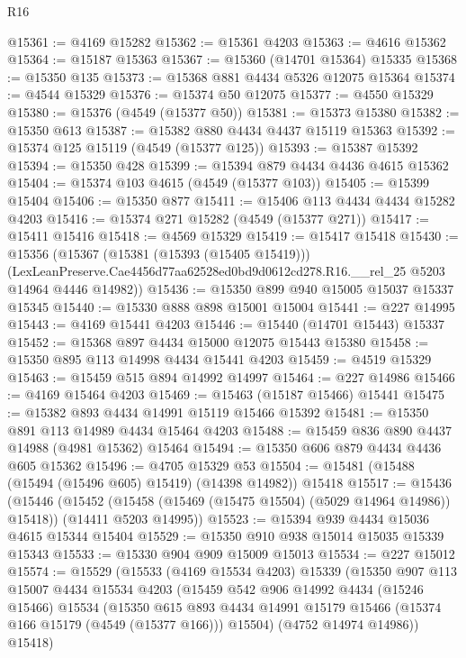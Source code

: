 \begin{lexlean}{R16}
\begin{coremodule}
@15361 := @4169 @15282
@15362 := @15361 @4203
@15363 := @4616 @15362
@15364 := @15187 @15363
@15367 := @15360 (@14701 @15364) @15335
@15368 := @15350 @135
@15373 := @15368 @881 @4434 @5326 @12075 @15364
@15374 := @4544 @15329
@15376 := @15374 @50 @12075
@15377 := @4550 @15329
@15380 := @15376 (@4549 (@15377 @50))
@15381 := @15373 @15380
@15382 := @15350 @613
@15387 := @15382 @880 @4434 @4437 @15119 @15363
@15392 := @15374 @125 @15119 (@4549 (@15377 @125))
@15393 := @15387 @15392
@15394 := @15350 @428
@15399 := @15394 @879 @4434 @4436 @4615 @15362
@15404 := @15374 @103 @4615 (@4549 (@15377 @103))
@15405 := @15399 @15404
@15406 := @15350 @877
@15411 := @15406 @113 @4434 @4434 @15282 @4203
@15416 := @15374 @271 @15282 (@4549 (@15377 @271))
@15417 := @15411 @15416
@15418 := @4569 @15329
@15419 := @15417 @15418
@15430 := @15356
    (@15367
      (@15381 (@15393 (@15405 @15419)))
      (LexLeanPreserve.Cae4456d77aa62528ed0bd9d0612cd278.R16.__rel_25 @5203 @14964 @4446 @14982))
@15436 := @15350 @899 @940 @15005 @15037 @15337 @15345
@15440 := @15330 @888 @898 @15001 @15004
@15441 := @227 @14995
@15443 := @4169 @15441 @4203
@15446 := @15440 (@14701 @15443) @15337
@15452 := @15368 @897 @4434 @15000 @12075 @15443 @15380
@15458 := @15350 @895 @113 @14998 @4434 @15441 @4203
@15459 := @4519 @15329
@15463 := @15459 @515 @894 @14992 @14997
@15464 := @227 @14986
@15466 := @4169 @15464 @4203
@15469 := @15463 (@15187 @15466) @15441
@15475 := @15382 @893 @4434 @14991 @15119 @15466 @15392
@15481 := @15350 @891 @113 @14989 @4434 @15464 @4203
@15488 := @15459 @836 @890 @4437 @14988 (@4981 @15362) @15464
@15494 := @15350 @606 @879 @4434 @4436 @605 @15362
@15496 := @4705 @15329 @53
@15504 := @15481 (@15488 (@15494 (@15496 @605) @15419) (@14398 @14982)) @15418
@15517 := @15436
    (@15446
      (@15452 (@15458 (@15469 (@15475 @15504) (@5029 @14964 @14986)) @15418))
      (@14411 @5203 @14995))
@15523 := @15394 @939 @4434 @15036 @4615 @15344 @15404
@15529 := @15350 @910 @938 @15014 @15035 @15339 @15343
@15533 := @15330 @904 @909 @15009 @15013
@15534 := @227 @15012
@15574 := @15529
    (@15533
      (@4169 @15534 @4203)
      @15339
      (@15350
        @907
        @113
        @15007
        @4434
        @15534
        @4203
        (@15459
          @542
          @906
          @14992
          @4434
          (@15246 @15466)
          @15534
          (@15350
            @615
            @893
            @4434
            @14991
            @15179
            @15466
            (@15374 @166 @15179 (@4549 (@15377 @166)))
            @15504)
          (@4752 @14974 @14986))
        @15418)

\end{coremodule}
\end{lexlean}
